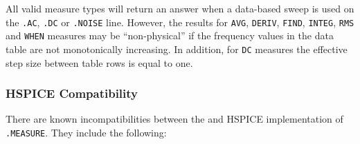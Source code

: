 All valid measure types will return an answer when a data-based sweep is used
on the \texttt{.AC}, \texttt{.DC} or \texttt{.NOISE} line.  However, the results
for \texttt{AVG}, \texttt{DERIV}, \texttt{FIND}, \texttt{INTEG}, \texttt{RMS}
and \texttt{WHEN} measures may be ``non-physical'' if the frequency values in the
data table are not monotonically increasing.  In addition, for \texttt{DC} measures
the effective step size between table rows is equal to one.

\subsubsection{HSPICE Compatibility}
\label{Measure_HSpice_Compatibility}
There are known incompatibilities between the \Xyce{} and HSPICE implementation
of {\tt .MEASURE}.  They include the following:

